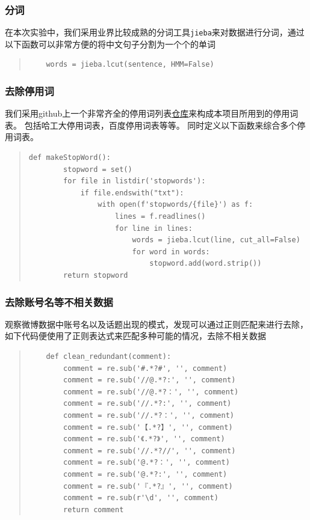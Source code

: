 \documentclass[UTF8]{ctexart}
\begin{document}
\subsubsection*{分词}
在本次实验中，我们采用业界比较成熟的分词工具\lstinline{jieba}来对数据进行分词，通过以下函数可以非常方便的将中文句子分割为一个个的单词
\begin{quote}
    \begin{lstlisting}
    words = jieba.lcut(sentence, HMM=False)
    \end{lstlisting}
\end{quote}

\subsubsection*{去除停用词}
我们采用github上一个非常齐全的停用词列表\href{https://github.com/goto456/stopwords}{仓库}来构成本项目所用到的停用词表。
包括哈工大停用词表，百度停用词表等等。
同时定义以下函数来综合多个停用词表。
\begin{quote}
    \begin{lstlisting}[]
    def makeStopWord():
        stopword = set()
        for file in listdir('stopwords'):
            if file.endswith("txt"):
                with open(f'stopwords/{file}') as f:
                    lines = f.readlines()
                    for line in lines:
                        words = jieba.lcut(line, cut_all=False)
                        for word in words:
                            stopword.add(word.strip())
        return stopword
    \end{lstlisting}
\end{quote}

\subsubsection*{去除账号名等不相关数据}
观察微博数据中账号名以及话题出现的模式，发现可以通过正则匹配来进行去除，如下代码便使用了正则表达式来匹配多种可能的情况，去除不相关数据
\begin{quote}
    \begin{lstlisting}
    def clean_redundant(comment):
        comment = re.sub('#.*?#', '', comment)
        comment = re.sub('//@.*?:', '', comment)
        comment = re.sub('//@.*?：', '', comment)
        comment = re.sub('//.*?:', '', comment)
        comment = re.sub('//.*?：', '', comment)
        comment = re.sub('【.*?】', '', comment)
        comment = re.sub('《.*?》', '', comment)
        comment = re.sub('//.*?//', '', comment)
        comment = re.sub('@.*?：', '', comment)
        comment = re.sub('@.*?:', '', comment)
        comment = re.sub('『.*?』', '', comment)
        comment = re.sub(r'\d', '', comment)
        return comment
    \end{lstlisting}
\end{quote}
\end{document}
